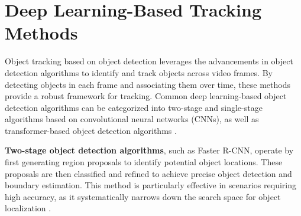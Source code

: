 \section{Deep Learning-Based Tracking Methods}
\label{sec:deep}



Object tracking based on object detection leverages the advancements in object detection algorithms to identify and track objects across video frames. By detecting objects in each frame and associating them over time, these methods provide a robust framework for tracking. Common deep learning-based object detection algorithms can be categorized into two-stage and single-stage algorithms based on convolutional neural networks (CNNs), as well as transformer-based object detection algorithms \cite{zhou2024real}.

\textbf{Two-stage object detection algorithms}, such as Faster R-CNN, operate by first generating region proposals to identify potential object locations. These proposals are then classified and refined to achieve precise object detection and boundary estimation. This method is particularly effective in scenarios requiring high accuracy, as it systematically narrows down the search space for object localization \cite{zhou2024real}.

